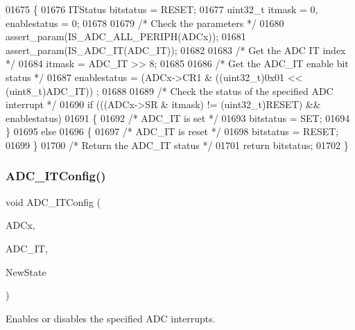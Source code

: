 \begin{DoxyCode}
01675 \{
01676   ITStatus bitstatus = RESET;
01677   uint32\_t itmask = 0, enablestatus = 0;
01678 
01679   \textcolor{comment}{/* Check the parameters */}
01680   assert_param(IS_ADC_ALL_PERIPH(ADCx));
01681   assert_param(IS_ADC_IT(ADC\_IT));
01682 
01683   \textcolor{comment}{/* Get the ADC IT index */}
01684   itmask = ADC\_IT >> 8;
01685 
01686   \textcolor{comment}{/* Get the ADC\_IT enable bit status */}
01687   enablestatus = (ADCx->CR1 & ((uint32\_t)0x01 << (uint8\_t)ADC\_IT)) ;
01688 
01689   \textcolor{comment}{/* Check the status of the specified ADC interrupt */}
01690   \textcolor{keywordflow}{if} (((ADCx->SR & itmask) != (uint32\_t)RESET) && enablestatus)
01691   \{
01692     \textcolor{comment}{/* ADC\_IT is set */}
01693     bitstatus = SET;
01694   \}
01695   \textcolor{keywordflow}{else}
01696   \{
01697     \textcolor{comment}{/* ADC\_IT is reset */}
01698     bitstatus = RESET;
01699   \}
01700   \textcolor{comment}{/* Return the ADC\_IT status */}
01701   \textcolor{keywordflow}{return}  bitstatus;
01702 \}
\end{DoxyCode}
\mbox{\label{group__ADC__Group7_gad4c84b54b539944f555488bf979f82b6}} 
\subsubsection{A\+D\+C\+\_\+\+I\+T\+Config()}
{\footnotesize\ttfamily void A\+D\+C\+\_\+\+I\+T\+Config (\begin{DoxyParamCaption}\item[{\textbf{ A\+D\+C\+\_\+\+Type\+Def} $\ast$}]{A\+D\+Cx,  }\item[{uint16\+\_\+t}]{A\+D\+C\+\_\+\+IT,  }\item[{\textbf{ Functional\+State}}]{New\+State }\end{DoxyParamCaption})}



Enables or disables the specified A\+DC interrupts. 


